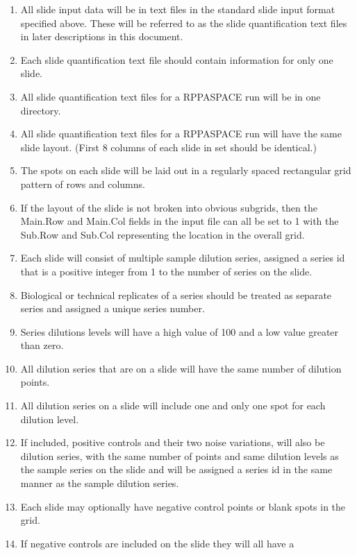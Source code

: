 \documentclass[
]{article}
\providecommand{\tightlist}{%
  \setlength{\itemsep}{0pt}\setlength{\parskip}{0pt}}
\begin{document}
\begin{enumerate}
\def\labelenumi{\arabic{enumi})}
\tightlist
\item
  All slide input data will be in text files in the standard slide input
  format specified above. These will be referred to as the slide
  quantification text files in later descriptions in this document.
\item
  Each slide quantification text file should contain information for
  only one slide.
\item
  All slide quantification text files for a RPPASPACE run will be in one
  directory.
\item
  All slide quantification text files for a RPPASPACE run will have the
  same slide layout. (First 8 columns of each slide in set should be
  identical.)
\item
  The spots on each slide will be laid out in a regularly spaced
  rectangular grid pattern of rows and columns.\\
\item
  If the layout of the slide is not broken into obvious subgrids, then
  the Main.Row and Main.Col fields in the input file can all be set to 1
  with the Sub.Row and Sub.Col representing the location in the overall
  grid.
\item
  Each slide will consist of multiple sample dilution series, assigned a
  series id that is a positive integer from 1 to the number of series on
  the slide.
\item
  Biological or technical replicates of a series should be treated as
  separate series and assigned a unique series number.
\item
  Series dilutions levels will have a high value of 100 and a low value
  greater than zero.
\item
  All dilution series that are on a slide will have the same number of
  dilution points.
\item
  All dilution series on a slide will include one and only one spot for
  each dilution level.
\item
  If included, positive controls and their two noise variations, will
  also be dilution series, with the same number of points and same
  dilution levels as the sample series on the slide and will be assigned
  a series id in the same manner as the sample dilution series.
\item
  Each slide may optionally have negative control points or blank spots
  in the grid.
\item
  If negative controls are included on the slide they will all have a

\end{enumerate}
\end{document}
